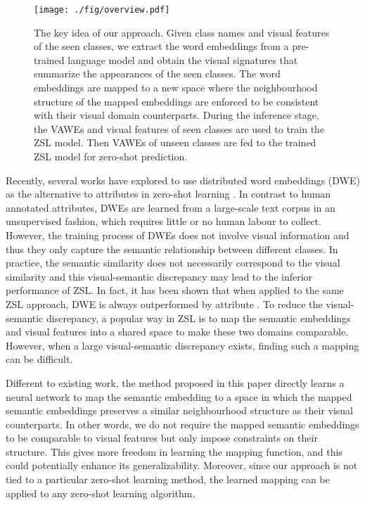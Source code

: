 \documentclass{bmvc2k}
\begin{document}
\begin{figure}[ht]
\begin{center}\label{fig:overview}
   \texttt{[image: ./fig/overview.pdf]}
\end{center}
   \caption{The key idea of our approach. Given class names and visual features of the seen classes, we extract the word embeddings from a pre-trained language model and obtain the visual signatures that summarize the appearances of the seen classes. The word embeddings are mapped to a new space where the neighbourhood structure of the mapped embeddings are enforced to be consistent with their visual domain counterparts. During the inference stage, the VAWEs and visual features of seen classes are used to train the ZSL model. Then VAWEs of unseen classes are fed to the trained ZSL model for zero-shot prediction.}
\label{fig:overview}
\end{figure}


Recently, several works have explored to use distributed word embeddings (DWE)  \cite{word2vec,glove} as the alternative to attributes in zero-shot learning \cite{Frome2013NIPS_devise,NorouziConse13}. In contrast to human annotated attributes, DWEs are learned from a large-scale text corpus in an unsupervised fashion, which requires little or no human labour to collect. However, the training process of DWEs does not involve visual information and thus they only capture the semantic relationship between different classes. In practice, the semantic similarity does not necessarily correspond to the visual similarity and this visual-semantic discrepancy may lead to the inferior performance of ZSL. In fact, it has been shown that when applied to the same ZSL approach, DWE is always outperformed by attribute \cite{Akata15output,SynC2016,LatEm2016}. To reduce the visual-semantic discrepancy, a popular way in ZSL is to map the semantic embeddings and visual features into a shared space \cite{Frome2013NIPS_devise,Romera2015ZSL,LatEm2016,Zhang2016CVPR, LongBMVC16} to make these two domains comparable. However, when a large visual-semantic discrepancy exists, finding such a mapping can be difficult.%

Different to existing work, the method proposed in this paper directly learns a neural network to map the semantic embedding to a space in which the mapped semantic embeddings preserves a similar neighbourhood structure as their visual counterparts. In other words, we do not require the mapped semantic embeddings to be comparable to visual features but only impose constraints on their structure. This gives more freedom in learning the mapping function, and this could potentially enhance its generalizability. Moreover, since our approach is not tied to a particular zero-shot learning method, the learned mapping can be applied to any zero-shot learning algorithm.
\end{document}

